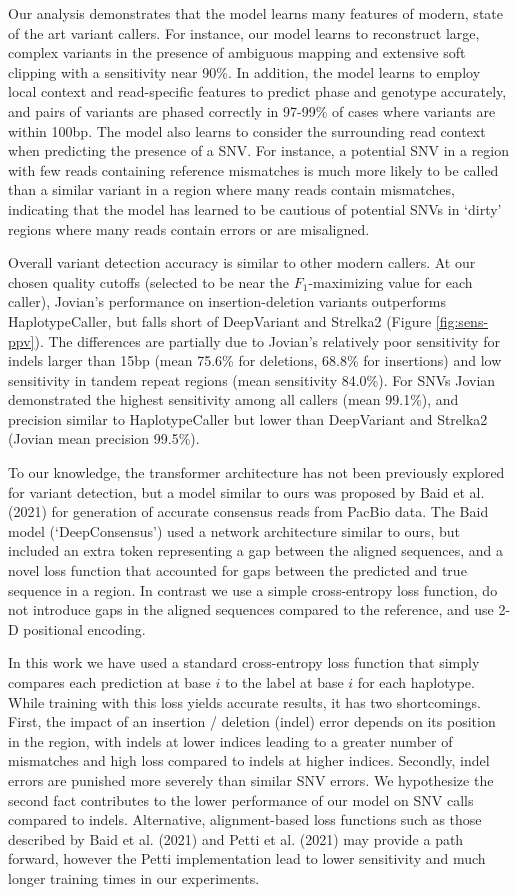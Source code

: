 \documentclass[]{article}
\begin{document}
Our analysis demonstrates that the model learns many features of modern, state of the art variant callers. For instance, our model learns to reconstruct large, complex variants in the presence of ambiguous mapping and extensive soft clipping with a sensitivity near 90\%. In addition, the model learns to employ local context and read-specific features to predict phase and genotype accurately, and pairs of variants are phased correctly in 97-99\% of cases where variants are within 100bp.  The model also learns to consider the surrounding read context when predicting the presence of a SNV. For instance, a potential SNV in a region with few reads containing reference mismatches is much more likely to be called than a similar variant in a region where many reads contain mismatches, indicating that the model has learned to be cautious of potential SNVs in `dirty' regions where many reads contain errors or are misaligned. 

Overall variant detection accuracy is similar to other modern callers. At our chosen quality cutoffs (selected to be near the $F_1$-maximizing value for each caller), Jovian's performance on insertion-deletion variants outperforms HaplotypeCaller, but falls short of DeepVariant and Strelka2 (Figure \ref{fig:sens-ppv}). The differences are partially due to Jovian's relatively poor sensitivity for indels larger than 15bp (mean 75.6\% for deletions, 68.8\% for insertions) and low sensitivity in tandem repeat regions (mean sensitivity 84.0\%).  For SNVs Jovian demonstrated the highest sensitivity among all callers (mean 99.1\%), and precision similar to HaplotypeCaller but lower than DeepVariant and Strelka2 (Jovian mean precision 99.5\%). 

To our knowledge, the transformer architecture has not been previously explored for variant detection, but a model similar to ours was proposed by Baid et al. (2021) for generation of accurate consensus reads from PacBio data. The Baid model (`DeepConsensus') used a network architecture similar to ours, but included an extra token representing a gap between the aligned sequences, and a novel loss function that accounted for gaps between the predicted and true sequence in a region. In contrast we use a simple cross-entropy loss function, do not introduce gaps in the aligned sequences compared to the reference, and use 2-D positional encoding.  

In this work we have used a standard cross-entropy loss function that simply compares each prediction at base $i$ to the label at base $i$ for each haplotype. While training with this loss yields accurate results, it has two shortcomings. First, the impact of an insertion / deletion (indel) error depends on its position in the region, with indels at lower indices leading to a greater number of mismatches and high loss compared to indels at higher indices. Secondly, indel errors are punished more severely than similar SNV errors. We hypothesize the second fact contributes to the lower performance of our model on SNV calls compared to indels. Alternative, alignment-based loss functions such as those described by Baid et al. (2021) and Petti et al. (2021) may provide a path forward, however the Petti implementation lead to lower sensitivity and much longer training times in our experiments. 
\end{document}

